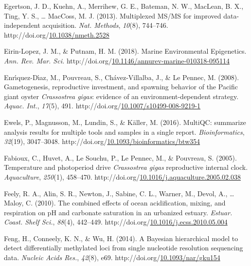 \documentclass [11pt, proquest] {uwthesis}[2015/03/03]
\newlength{\cslhangindent}
\newenvironment{CSLReferences}%
{\setlength{\parindent}{0pt}%
\everypar{\setlength{\hangindent}{\cslhangindent}}\ignorespaces}%
{\par}
\begin{document}
\begin{CSLReferences}{1}{0}
\leavevmode\hypertarget{ref-Egertson2013}{}%
Egertson, J. D., Kuehn, A., Merrihew, G. E., Bateman, N. W., MacLean, B. X., Ting, Y. S., \ldots{} MacCoss, M. J. (2013). {Multiplexed MS/MS for improved data-independent acquisition}. \emph{Nat. Methods}, \emph{10}(8), 744--746. http://doi.org/\href{https://doi.org/10.1038/nmeth.2528}{10.1038/nmeth.2528}

\leavevmode\hypertarget{ref-Eirin-Lopez2018}{}%
Eirin-Lopez, J. M., \& Putnam, H. M. (2018). {Marine Environmental Epigenetics}. \emph{Ann. Rev. Mar. Sci.} http://doi.org/\href{https://doi.org/10.1146/annurev-marine-010318-095114}{10.1146/annurev-marine-010318-095114}

\leavevmode\hypertarget{ref-Enriquez-Diaz2008}{}%
Enrı́quez-Dı́az, M., Pouvreau, S., Chávez-Villalba, J., \& Le Pennec, M. (2008). {Gametogenesis, reproductive investment, and spawning behavior of the Pacific giant oyster \emph{Crassostrea gigas}: evidence of an environment-dependent strategy}. \emph{Aquac. Int.}, \emph{17}(5), 491. http://doi.org/\href{https://doi.org/10.1007/s10499-008-9219-1}{10.1007/s10499-008-9219-1}

\leavevmode\hypertarget{ref-Ewels2016}{}%
Ewels, P., Magnusson, M., Lundin, S., \& Käller, M. (2016). {MultiQC: summarize analysis results for multiple tools and samples in a single report}. \emph{Bioinformatics}, \emph{32}(19), 3047--3048. http://doi.org/\href{https://doi.org/10.1093/bioinformatics/btw354}{10.1093/bioinformatics/btw354}

\leavevmode\hypertarget{ref-Fabioux2005}{}%
Fabioux, C., Huvet, A., Le Souchu, P., Le Pennec, M., \& Pouvreau, S. (2005). {Temperature and photoperiod drive \emph{Crassostrea gigas} reproductive internal clock}. \emph{Aquaculture}, \emph{250}(1), 458--470. http://doi.org/\href{https://doi.org/10.1016/j.aquaculture.2005.02.038}{10.1016/j.aquaculture.2005.02.038}

\leavevmode\hypertarget{ref-Feely2010}{}%
Feely, R. A., Alin, S. R., Newton, J., Sabine, C. L., Warner, M., Devol, A., \ldots{} Maloy, C. (2010). {The combined effects of ocean acidification, mixing, and respiration on pH and carbonate saturation in an urbanized estuary}. \emph{Estuar. Coast. Shelf Sci.}, \emph{88}(4), 442--449. http://doi.org/\href{https://doi.org/10.1016/j.ecss.2010.05.004}{10.1016/j.ecss.2010.05.004}

\leavevmode\hypertarget{ref-Feng2014}{}%
Feng, H., Conneely, K. N., \& Wu, H. (2014). {A Bayesian hierarchical model to detect differentially methylated loci from single nucleotide resolution sequencing data}. \emph{Nucleic Acids Res.}, \emph{42}(8), e69. http://doi.org/\href{https://doi.org/10.1093/nar/gku154}{10.1093/nar/gku154}


\end{CSLReferences}
\end{document}
